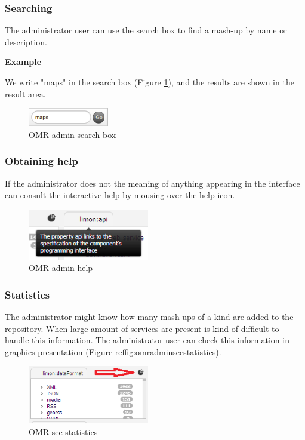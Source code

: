 \subsubsection{Searching}
The administrator user can use the search box to find a mash-up by name or description.

\textbf{Example}

We write "maps" in the search box (Figure \ref{fig:omradminsearchbox}), and the results are shown in the result area.

\begin{figure}[h]
	\centering
	\includegraphics[width=100pt]{graphics/maps-search.png}
	\caption{OMR admin search box}
	\label{fig:omradminsearchbox}
\end{figure}

\subsubsection{Obtaining help}
If the administrator does not the meaning of anything appearing in the interface can consult the interactive help by mousing over the help icon.
\begin{figure}[h]
	\centering
	\includegraphics[width=150pt]{graphics/omr-admin-help.png}
	\caption{OMR admin help}
	\label{fig:omradminhelp}
\end{figure}

\subsubsection{Statistics}
\label{subsec:appendixstatistics}

The administrator might know how many mash-ups of a kind are added to the repository. When large amount of services are present is kind of difficult to handle this information. The administrator user can check this information in graphics presentation (Figure ref{fig:omradminseestatistics}).

\begin{figure}[h]
	\centering
	\includegraphics[width=150pt]{graphics/omr-admin-see-statistics.png}
	\caption{OMR see statistics}
	\label{fig:omradminseestatistics}
\end{figure}


